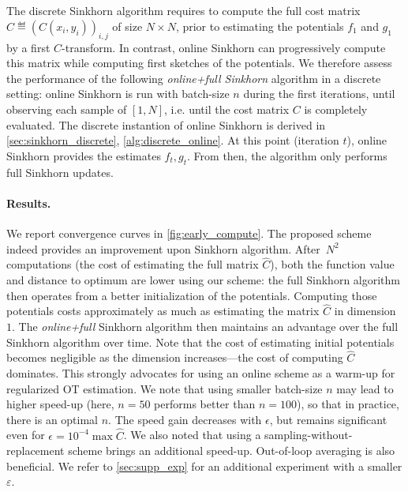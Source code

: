 The discrete Sinkhorn algorithm requires to compute the full cost matrix $\hat C \eqdef
(C(x_i,y_i))_{i,j}$  of size $N \times N$, prior to estimating the
potentials $f_1$ and $g_1$ by a first $C$-transform. In contrast, online Sinkhorn can progressively
compute this matrix while computing first sketches of the potentials. We therefore
assess the performance of the following \textit{online+full Sinkhorn} algorithm
in a discrete setting: online Sinkhorn is run with batch-size $n$ during the first iterations, until
observing each sample of $[1,N]$, i.e. until the cost matrix $C$ is completely evaluated. The discrete instantion of online Sinkhorn is derived in \autoref{sec:sinkhorn_discrete}, \autoref{alg:discrete_online}. 
At this point (iteration $t$), online Sinkhorn provides the estimates $f_{t},
g_{t}$. From then, the algorithm only performs full Sinkhorn updates.


\paragraph{Results.} We report convergence curves in
\autoref{fig:early_compute}. The proposed scheme indeed provides an improvement
upon Sinkhorn algorithm. After $N^2$ computations (the cost of estimating the
full matrix $\hat C$), both the function value and distance to optimum are lower
using our scheme: the full Sinkhorn algorithm then operates from a better
initialization of the potentials. Computing those potentials costs approximately as much as
estimating the matrix $\hat C$ in dimension $1$. The \textit{online+full}
Sinkhorn algorithm then maintains an advantage over the full Sinkhorn algorithm
over time. Note that the cost of estimating initial potentials becomes negligible
as the dimension increases---the cost of computing $\hat C$ dominates. This
strongly advocates for using an online scheme as a warm-up for regularized OT
estimation. We note that using smaller batch-size $n$ may lead to higher speed-up (here, $n=50$ performs better than $n=100$), so that in practice, there is an optimal $n$. The speed gain decreases with $\epsilon$, but remains
significant even for $\epsilon = 10^{-4} \max \hat C$. We also noted that
using a sampling-without-replacement scheme brings an additional speed-up. Out-of-loop averaging is also beneficial. We refer to \autoref{sec:supp_exp} for an additional experiment with a smaller $\varepsilon$.
